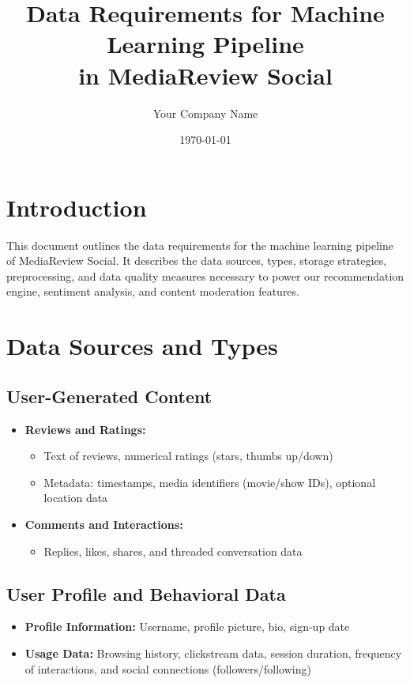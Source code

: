 \documentclass[11pt]{article}
\title{Data Requirements for Machine Learning Pipeline\\ in MediaReview Social}
\author{Your Company Name}
\date{\today}
\begin{document}
\maketitle
\tableofcontents
\newpage

\section{Introduction}
This document outlines the data requirements for the machine learning pipeline of MediaReview Social. It describes the data sources, types, storage strategies, preprocessing, and data quality measures necessary to power our recommendation engine, sentiment analysis, and content moderation features.

\section{Data Sources and Types}
\subsection*{User-Generated Content}
\begin{itemize}[noitemsep]
    \item \textbf{Reviews and Ratings:}
    \begin{itemize}[noitemsep]
        \item Text of reviews, numerical ratings (stars, thumbs up/down)
        \item Metadata: timestamps, media identifiers (movie/show IDs), optional location data
    \end{itemize}
    \item \textbf{Comments and Interactions:}
    \begin{itemize}[noitemsep]
        \item Replies, likes, shares, and threaded conversation data
    \end{itemize}
\end{itemize}

\subsection*{User Profile and Behavioral Data}
\begin{itemize}[noitemsep]
    \item \textbf{Profile Information:} Username, profile picture, bio, sign-up date
    \item \textbf{Usage Data:} Browsing history, clickstream data, session duration, frequency of interactions, and social connections (followers/following)
\end{itemize}
\end{document}
